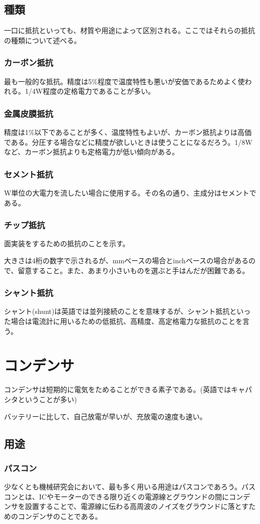 \documentclass[a4paper,titlepage,here]{ujarticle}
\begin{document}
\subsection{種類}
一口に抵抗といっても、材質や用途によって区別される。ここではそれらの抵抗の種類について述べる。
\subsubsection{カーボン抵抗}
最も一般的な抵抗。精度は5\%程度で温度特性も悪いが安価であるためよく使われる。1/4W程度の定格電力であることが多い。
\subsubsection{金属皮膜抵抗}
精度は1\%以下であることが多く、温度特性もよいが、カーボン抵抗よりは高価である。分圧する場合などに精度が欲しいときは使うことになるだろう。1/8Wなど、カーボン抵抗よりも定格電力が低い傾向がある。
\subsubsection{セメント抵抗}
W単位の大電力を流したい場合に使用する。その名の通り、主成分はセメントである。
\subsubsection{チップ抵抗}
面実装をするための抵抗のことを示す。

大きさは4桁の数字で示されるが、mmベースの場合とinchベースの場合があるので、留意すること。また、あまり小さいものを選ぶと手はんだが困難である。
\subsubsection{シャント抵抗}
シャント(shunt)は英語では並列接続のことを意味するが、シャント抵抗といった場合は電流計に用いるための低抵抗、高精度、高定格電力な抵抗のことを言う。
\section{コンデンサ}
コンデンサは短期的に電気をためることができる素子である。(英語ではキャパシタということが多い)

バッテリーに比して、自己放電が早いが、充放電の速度も速い。
\subsection{用途}
\subsubsection{パスコン}
少なくとも機械研究会において、最も多く用いる用途はパスコンであろう。パスコンとは、ICやモーターのできる限り近くの電源線とグラウンドの間にコンデンサを設置することで、電源線に伝わる高周波のノイズをグラウンドに落とすためのコンデンサのことである。
\end{document}

